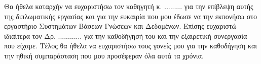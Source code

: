 \begin{acknowledgements}
Θα ήθελα καταρχήν να ευχαριστήσω τον καθηγητή κ. .........
για την επίβλεψη αυτής της διπλωματικής εργασίας και για την
ευκαιρία που μου έδωσε να την εκπονήσω στο εργαστήριο Συστημάτων
Βάσεων Γνώσεων και Δεδομένων. Επίσης ευχαριστώ ιδιαίτερα τον Δρ.
............ για την καθοδήγησή του και την εξαιρετική
συνεργασία που είχαμε. Τέλος θα ήθελα να ευχαριστήσω τους γονείς
μου για την καθοδήγηση και την ηθική συμπαράσταση που μου
προσέφεραν όλα αυτά τα χρόνια.
\end{acknowledgements}